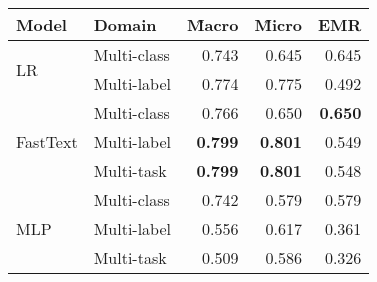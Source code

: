 \begin{tabular}{llrrr}
\toprule
Model & Domain&  \f{Macro} &   \f{Micro} &    EMR \\

\midrule
\multirow{2}{*}{LR} & Multi-class &     0.743 &      0.645 &  0.645 \\
         & Multi-label &     0.774 &      0.775 &  0.492 \\
\cmidrule{2-5}
\multirow{3}{*}{FastText} & Multi-class &     0.766 &      0.650 &  \bfseries 0.650 \\
         & Multi-label &     \bfseries0.799 &      \bfseries 0.801 &  0.549 \\
         & Multi-task  &     \bfseries0.799 &      \bfseries 0.801 &  0.548 \\
\cmidrule{2-5}
\multirow{3}{*}{MLP} & Multi-class &     0.742 &      0.579 &  0.579 \\
         & Multi-label &     0.556 &      0.617 &  0.361 \\
         & Multi-task  &     0.509 &      0.586 &  0.326 \\
\bottomrule
\end{tabular}
